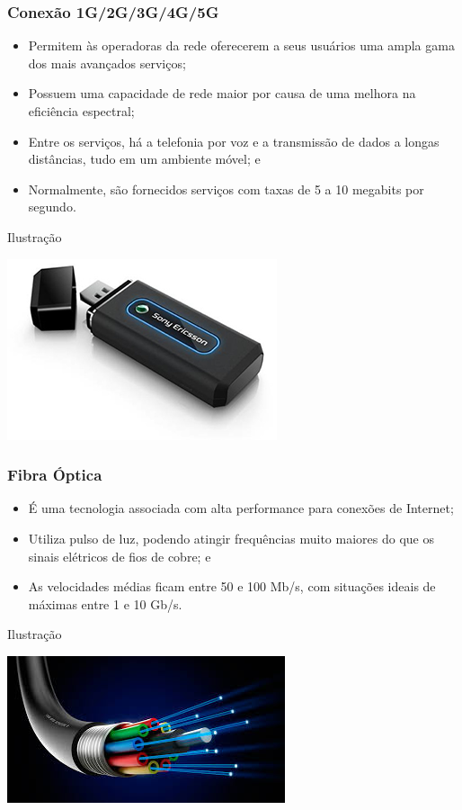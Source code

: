 \documentclass[aspectratio=169]{beamer} %
\begin{document}
\begin{frame}
	\frametitle{Conexão 1G/2G/3G/4G/5G}
			
	\begin{itemize}
		\item Permitem às operadoras da rede oferecerem a seus usuários uma ampla gama dos mais avançados serviços;
		\item Possuem uma capacidade de rede maior por causa de uma melhora na eficiência espectral;
		\item Entre os serviços, há a telefonia por voz e a transmissão de dados a longas distâncias, tudo em um ambiente móvel; e
		\item Normalmente, são fornecidos serviços com taxas de 5 a 10 megabits por segundo.
	\end{itemize}\vfill
	
	\begin{exampleblock}{Ilustra\c cão}
		\begin{center}
			\includegraphics[scale=0.4]{img/modem-3g}
		\end{center}
	\end{exampleblock}
\end{frame}

\begin{frame}
	\frametitle{Fibra Óptica}
			
	\begin{itemize}
		\item É uma tecnologia associada com alta performance para conexões de Internet;
		\item Utiliza pulso de luz, podendo atingir frequências muito maiores do que os sinais elétricos de fios de cobre; e
		\item As velocidades médias ficam entre 50 e 100 Mb/s, com situações ideais de máximas entre 1 e 10 Gb/s.
	\end{itemize}\vfill
	
	\begin{exampleblock}{Ilustra\c cão}
		\begin{center}
			\includegraphics[scale=0.4]{img/fibra}
		\end{center}
	\end{exampleblock}
\end{frame}
\end{document}
